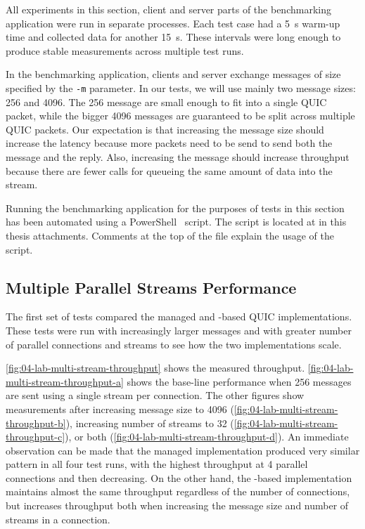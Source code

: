 All experiments in this section, client and server parts of the benchmarking application were run in
separate processes. Each test case had a \SI{5}{\second} warm-up time and collected data for another
\SI{15}{\second}. These intervals were long enough to produce stable measurements across multiple
test runs.

In the benchmarking application, clients and server exchange messages of size specified by the
\texttt{-m} parameter. In our tests, we will use mainly two message sizes: \SI{256}{\byte} and
\SI{4096}{\byte}. The \SI{256}{\byte} message are small enough to fit into a single QUIC packet,
while the bigger \SI{4096}{\byte} messages are guaranteed to be split across multiple QUIC packets.
Our expectation is that increasing the message size should increase the latency because more packets
need to be send to send both the message and the reply. Also, increasing the message should increase
throughput because there are fewer calls for queueing the same amount of data into the stream.

Running the benchmarking application for the purposes of tests in this section has been automated
using a PowerShell~\cite{powershell} script. The script is located at
 in this thesis attachments. Comments
at the top of the file explain the usage of the script.

\subsection{Multiple Parallel Streams Performance}\label{sec:04-multi-stream-perf}

The first set of tests compared the managed and \libmsquic{}-based QUIC implementations. These tests
were run with increasingly larger messages and with greater number of parallel connections and
streams to see how the two implementations scale.

\autoref{fig:04-lab-multi-stream-throughput} shows the measured throughput.
\autoref{fig:04-lab-multi-stream-throughput-a} shows the base-line performance when \SI{256}{\byte}
messages are sent using a single stream per connection. The other figures show measurements after
increasing message size to \SI{4096}{\byte} (\autoref{fig:04-lab-multi-stream-throughput-b}),
increasing number of streams to 32 (\autoref{fig:04-lab-multi-stream-throughput-c}), or both
(\autoref{fig:04-lab-multi-stream-throughput-d}). An immediate observation can be made that the
managed implementation produced very similar pattern in all four test runs, with the highest
throughput at 4 parallel connections and then decreasing. On the other hand, the \libmsquic{}-based
implementation maintains almost the same throughput regardless of the number of connections, but
increases throughput both when increasing the message size and number of streams in a connection.

